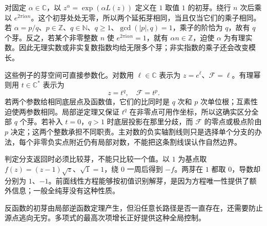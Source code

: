 \ProseParagraphBreak
对固定 \(\alpha\in\mathbb C\)，以 \(z^\alpha=\exp(\alpha L(z))\) 定义在 \(1\) 取值 \(1\) 的初芽。绕行 \(n\) 次后乘以 \(e^{2\pi\mathrm{i}\alpha n}\)。这个初芽处处无零，所以两个延拓芽相同，当且仅当它们的乘子相同。若 \(\alpha=p/q\)、\(p\in\mathbb Z\)、\(q\in\mathbb N\)、\(q\ge1\)、\(\gcd(|p|,q)=1\)，乘子的阶恰为 \(q\)，故有 \(q\) 个芽。反之，若某个非零整数 \(n\) 使 \(e^{2\pi\mathrm{i}\alpha n}=1\)，就有 \(\alpha n\in\mathbb Z\)，迫使 \(\alpha\) 为有理实数。因此无理实数或非实复数指数均给无限多个芽；非实指数的乘子还会改变模长。

\ProseParagraphBreak
这些例子的芽空间可直接参数化。对数用 \(\ell\in\mathbb C\) 表示为 \(z=e^\ell\)、\(\mathcal F=\ell\)。有理幂则用 \(t\in\mathbb C^*\) 表示为
\[
 z=t^q,\quad\mathcal F=t^p.
\]
若两个参数给相同底层点及函数值，它们的比同时是 \(q\) 次和 \(p\) 次单位根；互素性迫使两参数相同。局部逆定理又保证 \(t^q\) 在非零点可用作坐标，所以这确实区分全部 \(q\) 个芽。若补入 \(t=0\)，\(q>1\) 时底层投影在那里分歧，而 \(\mathcal F\) 的零点或极点阶由 \(p\) 决定；这两个整数承担不同职责。主对数的负实轴割线则只是选择单个分支的办法，每个非零负实点附近仍有局部对数，不能把这条割线误认作自然边界。

\ProseParagraphBreak
判定分支返回时必须比较芽，不能只比较一个值。以 \(1\) 为基点取 \(f(z)=(z-1)\sqrt z\)、\(\sqrt1=1\)，绕 \(0\) 一周后得到 \(-f\)。两芽在 \(1\) 都取 \(0\)，导数却分别为 \(1\)、\(-1\)。前面线性方程能够按初值识别解芽，是因为方程唯一性提供了额外信息；一般全纯芽没有这种性质。

\ProseParagraphBreak
反函数的初芽由局部逆函数定理产生，但沿任意长路径是否一直存在，还需要防止源点逃向无穷。多项式的最高次项增长正好提供这种全局控制。

